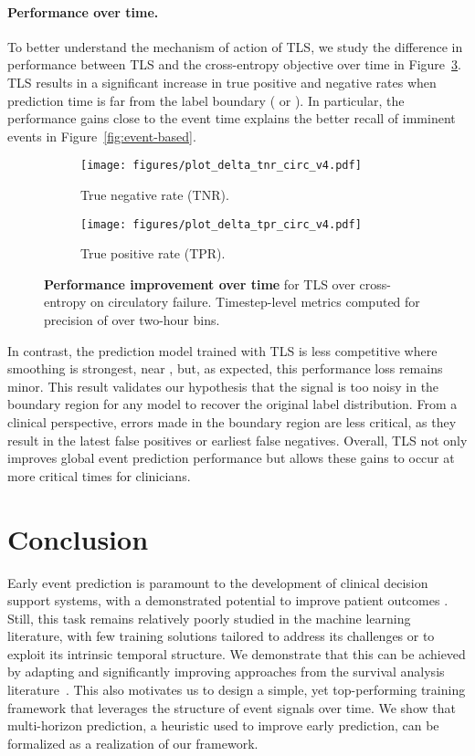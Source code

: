 \documentclass[nohyperref]{article}
\begin{document}
\paragraph{Performance over time.} To better understand the mechanism of action of TLS, we study the difference in performance between TLS and the cross-entropy objective over time in Figure~\ref{fig:plot_delta}. TLS results in a significant increase in true positive and negative rates when prediction time is far from the label boundary ( or ). In particular, the performance gains close to the event time  explains the better recall of imminent events in Figure~\ref{fig:event-based}.

\begin{figure}[h]
\begin{subfigure}[b]{0.47\textwidth}
  \centering
  \texttt{[image: figures/plot\_delta\_tnr\_circ\_v4.pdf]}\caption{True negative rate (TNR).}
  \label{fig:delta_tnr_circ}
\end{subfigure} \hfill
\begin{subfigure}[b]{0.47\textwidth}
 \centering
  \texttt{[image: figures/plot\_delta\_tpr\_circ\_v4.pdf]}\caption{True positive rate (TPR).}
  \label{fig:delta_tpr_circ}
\end{subfigure}
\caption{\textbf{Performance improvement over time} for TLS over cross-entropy on circulatory failure.
Timestep-level metrics computed for precision of  over two-hour bins.}
\label{fig:plot_delta}
\end{figure}


In contrast, the prediction model trained with TLS is less competitive where smoothing is strongest, near , but, as expected, this performance loss remains minor. This result validates our hypothesis that the signal is too noisy in the boundary region for any model to recover the original label distribution. From a clinical perspective, errors made in the boundary region are less critical, as they result in the latest false positives or earliest false negatives. Overall, TLS not only improves global event prediction performance but allows these gains to occur at more critical times for clinicians.



\section{Conclusion}


Early event prediction is paramount to the development of clinical decision support systems, with a demonstrated potential to improve patient outcomes \citep{smith2013}. Still, this task remains relatively poorly studied in the machine learning literature, with few training solutions tailored to address its challenges or to exploit its intrinsic temporal structure. We demonstrate that this can be achieved by adapting and significantly improving approaches from the survival analysis literature~\citep{van2007dynamic, parast2014landmark}. This also motivates us to design a simple, yet top-performing training framework that leverages the structure of event signals over time. We show that multi-horizon prediction, a heuristic used to improve early prediction, can be formalized as a realization of our framework. 
\end{document}
